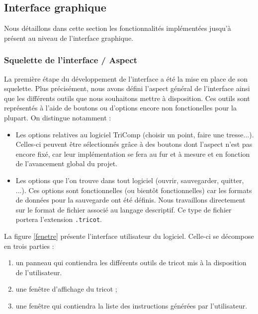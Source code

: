 \documentclass{article}
\begin{document}
\subsection{Interface graphique}

Nous détaillons dans cette section les fonctionnalités implémentées jusqu'à présent au niveau de l'interface graphique.

\subsubsection{Squelette de l'interface / Aspect}

La première étape du développement de l'interface a été la mise en place de son squelette. Plus précisément, nous avons défini l'aspect
général de l'interface ainsi que les différents outils que nous souhaitons mettre à disposition. Ces outils sont représentés à l'aide de
boutons ou d'options encore non fonctionelles pour la plupart. On distingue notamment :
\begin{itemize}
  \item Les options relatives au logiciel TriComp (choisir un point, faire une tresse...). Celles-ci peuvent être sélectionnés grâce à des
boutons dont l'aspect n'est pas encore fixé, car leur implémentation se fera au fur et à mesure et en fonction de l'avancement global du
projet.
  \item Les options que l'on trouve dans tout logiciel (ouvrir, sauvegarder, quitter, ...). Ces options sont fonctionnelles (ou bientôt
fonctionnelles) car les formats de données pour la sauvegarde ont été définis. Nous travaillons directement sur le format de fichier
associé au langage descriptif. Ce type de fichier portera l'extension \texttt{.tricot}.
\end{itemize}
La figure \ref{fenetre} présente l'interface utilisateur du logiciel. Celle-ci se décompose en trois parties : 
\begin{enumerate}
   \item un panneau qui contiendra les différents outils de tricot mis à la disposition de l'utilisateur.
   \item une fenêtre d'affichage du tricot ;
   \item une fenêtre qui contiendra la liste des instructions générées par l'utilisateur.
\end{enumerate}
\end{document}

